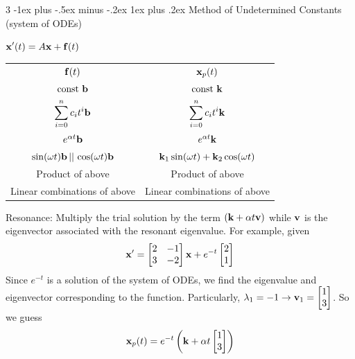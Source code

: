 \documentclass[10pt,landscape]{article}
\makeatletter
\renewcommand{\subsubsection}{\@startsection{subsubsection}{3}{0mm}%
                                    {-1ex plus -.5ex minus -.2ex}%
                                    {1ex plus .2ex}%
                                    {\normalfont\small\bfseries}}
\makeatother
\begin{document}
\begin{multicols}{3}
    \subsubsection{Method of Undetermined Constants \\(system of ODEs)}
        \begin{center}{$\displaystyle \vb{x'}(t) = A \vb{x} + \vb{f}(t)$}
            \begin{tabular}{ c | c }
            $\vb{f}(t)$ & $\vb{x}_p(t)$\\ 
            $\displaystyle \text{const } \vb{b}$ & $\displaystyle \text{const }\vb{k}$ \\ 
            $\displaystyle  \sum_{i=0}^n c_i t^i \vb{b}$ &$\displaystyle\sum_{i=0}^n c_i t^i\vb{k}$\\  
            $e^{\alpha t}\vb{b}$ & $e^{\alpha t}\vb{k}$\\
            $\sin(\omega t)\vb{b} \,||\, \cos (\omega t)\vb{b} $ & $\vb{k}_1\sin(\omega t) + \vb{k}_2\cos (\omega t)$\\
            Product of above & Product of above\\
            Linear combinations of above & Linear combinations of above
            \end{tabular}
            \end{center}
            Resonance: Multiply the trial solution by the term $(\vb{k} + \alpha t\vb{v})$ while $\vb{v}$ is the eigenvector associated with the resonant eigenvalue. For example, given
            \[\vb{x}' = \begin{bmatrix}
            2 & -1\\
            3 & -2
            \end{bmatrix}\vb{x} + e^{-t}\begin{bmatrix}
                2\\
                1
            \end{bmatrix}\]
            Since $e^{-t}$ is a solution of the system of ODEs, we find the eigenvalue and eigenvector corresponding to the function. Particularly, $\lambda_1 = -1 \to \vb{v}_1 =\begin{bmatrix}
            1 \\
            3
            \end{bmatrix}$. So we guess \[\vb{x}_p (t) = e^{-t} \left(\vb{k} + \alpha t\begin{bmatrix}
            1 \\
            3\end{bmatrix}\right)\]


\end{multicols}
\end{document}
